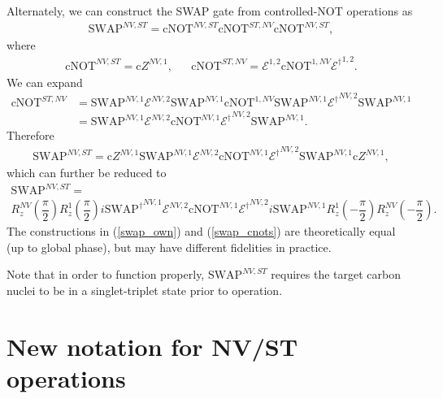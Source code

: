 \documentclass[11pt]{article}
\renewcommand{\t}{\text} %
\newcommand{\f}[2]{\dfrac{#1}{#2}} %
\newcommand{\p}[1]{\left(#1\right)} %
\newcommand{\E}{\mathcal E}
\begin{document}
Alternately, we can construct the SWAP gate from controlled-NOT
operations as
\begin{align}
  \t{SWAP}^{NV,ST}=\t{cNOT}^{NV,ST}\t{cNOT}^{ST,NV}\t{cNOT}^{NV,ST},
\end{align}
where
\begin{align}
  \t{cNOT}^{NV,ST}=\t{c}Z^{NV,1}, &&
  \t{cNOT}^{ST,NV}=\E^{1,2}\t{cNOT}^{1,NV}{\E^\dag}^{1,2}.
\end{align}
We can expand
\begin{align}
  \t{cNOT}^{ST,NV}&=\t{SWAP}^{NV,1}\E^{NV,2}\t{SWAP}^{NV,1}\t{cNOT}^{1,NV}
  \t{SWAP}^{NV,1}{\E^\dag}^{NV,2}\t{SWAP}^{NV,1} \\
  &=\t{SWAP}^{NV,1}\E^{NV,2}\t{cNOT}^{NV,1}{\E^\dag}^{NV,2}\t{SWAP}^{NV,1}.
\end{align}
Therefore
\begin{align}
  \t{SWAP}^{NV,ST}=\t{c}Z^{NV,1}\t{SWAP}^{NV,1}
  \E^{NV,2}\t{cNOT}^{NV,1}{\E^\dag}^{NV,2}
  \t{SWAP}^{NV,1}\t{c}Z^{NV,1},
\end{align}
which can further be reduced to
\begin{multline}
  \t{SWAP}^{NV,ST}= \\
  R_z^{NV}\p{\f\pi2}R_z^1\p{\f\pi2}{i\t{SWAP}^\dag}^{NV,1}
  \E^{NV,2}\t{cNOT}^{NV,1}{\E^\dag}^{NV,2}
  i\t{SWAP}^{NV,1}R_z^1\p{-\f\pi2}R_z^{NV}\p{-\f\pi2}.
  \label{swap_cnots}
\end{multline}
The constructions in (\ref{swap_own}) and (\ref{swap_cnots}) are
theoretically equal (up to global phase), but may have different
fidelities in practice.

Note that in order to function properly, $\t{SWAP}^{NV,ST}$ requires
the target carbon nuclei to be in a singlet-triplet state prior to
operation.

\newpage
\section*{New notation for NV/ST operations}
\end{document}
